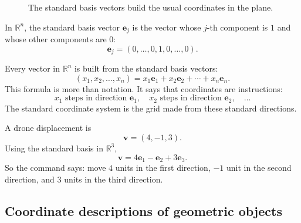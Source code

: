 \begin{figure}[h]
\centering
{}
\caption{The standard basis vectors build the usual coordinates in the plane.}
\end{figure}

\begin{definition}
In \(\mathbb R^n\), the standard basis vector \(\mathbf e_j\) is the vector whose
\(j\)-th component is \(1\) and whose other components are \(0\):
\[
    \mathbf e_j=(0,\ldots,0,1,0,\ldots,0).
\]
\end{definition}

Every vector in \(\mathbb R^n\) is built from the standard basis vectors:
\[
    (x_1,x_2,\ldots,x_n)
    =
    x_1\mathbf e_1+x_2\mathbf e_2+\cdots+x_n\mathbf e_n.
\]
This formula is more than notation.  It says that coordinates are instructions:
\[
    x_1 \text{ steps in direction } \mathbf e_1,\quad
    x_2 \text{ steps in direction } \mathbf e_2,\quad
    \ldots
\]
The standard coordinate system is the grid made from these standard directions.

\begin{example}
A drone displacement is
\[
    \mathbf v=(4,-1,3).
\]
Using the standard basis in \(\mathbb R^3\),
\[
    \mathbf v
    =
    4\mathbf e_1-\mathbf e_2+3\mathbf e_3.
\]
So the command says: move \(4\) units in the first direction, \(-1\) unit in the
second direction, and \(3\) units in the third direction.
\end{example}

\subsection{Coordinate descriptions of geometric objects}

